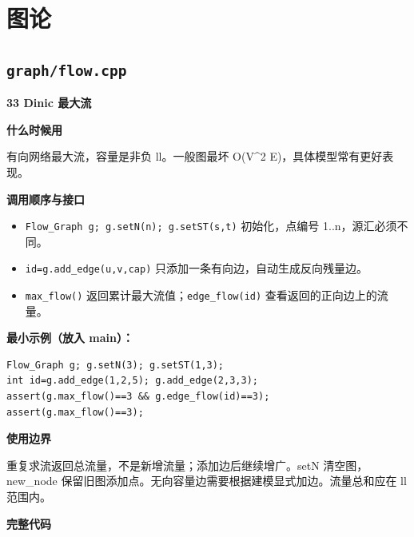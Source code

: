 \documentclass[UTF8,a4paper,10pt]{ctexart}
\newcommand{\TemplUsage}[1]{\textbf{什么时候用}\par #1\par}
\newcommand{\TemplApi}[1]{\textbf{调用顺序与接口}\par #1\par}
\newcommand{\TemplNote}[1]{\textbf{使用边界}\par #1\par}
\begin{document}
\par\vspace{1em}
\clearpage
\section{图论}
\subsection{\texttt{graph/flow.cpp}}
\textbf{33 Dinic 最大流}

\TemplUsage{有向网络最大流，容量是非负 ll。一般图最坏 O(V\textasciicircum{}2 E)，具体模型常有更好表现。}
\TemplApi{\begin{itemize}
\item \texttt{Flow\_Graph g; g.setN(n); g.setST(s,t)} 初始化，点编号 1..n，源汇必须不同。
\item \texttt{id=g.add\_edge(u,v,cap)} 只添加一条有向边，自动生成反向残量边。
\item \texttt{max\_flow()} 返回累计最大流值；\texttt{edge\_flow(id)} 查看返回的正向边上的流量。
\end{itemize}}
\textbf{最小示例（放入 main）：}
\begin{lstlisting}
Flow_Graph g; g.setN(3); g.setST(1,3);
int id=g.add_edge(1,2,5); g.add_edge(2,3,3);
assert(g.max_flow()==3 && g.edge_flow(id)==3);
assert(g.max_flow()==3);
\end{lstlisting}
\TemplNote{重复求流返回总流量，不是新增流量；添加边后继续增广。setN 清空图，new\_node 保留旧图添加点。无向容量边需要根据建模显式加边。流量总和应在 ll 范围内。}
\textbf{完整代码}
\end{document}
